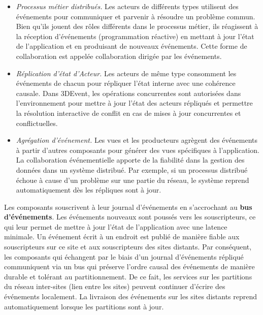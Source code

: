 \begin{itemize}
	\item \textit{Processus métier distribués.} Les acteurs de différents types 
	utilisent des événements pour communiquer et parvenir à résoudre un problème 
	commun. Bien qu'ils jouent des rôles différents dans le processus métier, ils 
	réagissent à la réception d'événements (programmation réactive) en 
	mettant à jour l'état de l'application et en produisant de nouveaux événements. 
	Cette forme de collaboration est appelée collaboration dirigée par les 
	événements.
	\item\textit{Réplication d'état d'Acteur.} Les acteurs de même type consomment 
	les événements de chacun pour répliquer l'état interne avec une cohérence 
	causale. Dans 3DEvent, les opérations concurrentes sont autorisées dans 
	l'environnement pour mettre à jour l'état des acteurs répliqués et permettre la 
	résolution interactive de conflit en cas de mises à jour concurrentes et 
	conflictuelles. 
	\item \textit{Agrégation d'événement.} Les vues et les producteurs agrègent des 
	événements à partir d'autres composants pour générer des vues spécifiques à 
	l'application.
	La collaboration événementielle apporte de la fiabilité dans la gestion des 
	données dans un système distribué. Par exemple, si un processus distribué 
	échoue à cause d'un problème sur une partie du réseau, le système reprend 
	automatiquement dès les répliques sont à jour.
\end{itemize}

Les composants souscrivent à leur journal d'événements en s'accrochant au 
\textbf{bus d'événements}.
Les événements nouveaux sont poussés vers les souscripteurs, 
ce qui leur permet de mettre à jour l'état de l'application avec une latence 
minimale. 
Un événement écrit à un endroit est publié de manière fiable aux souscripteurs sur 
ce site et aux souscripteurs des sites distants. 
Par conséquent, les composants qui échangent par le biais d'un 
journal d'événements répliqué communiquent via un bus qui préserve l'ordre causal 
des événements de manière durable et tolérant au partitionnement. De ce fait, les 
services sur les partitions du réseau inter-sites (lien entre les sites) peuvent 
continuer d'écrire des événements localement. La livraison des événements sur 
les sites distants reprend automatiquement lorsque les partitions sont à jour.


